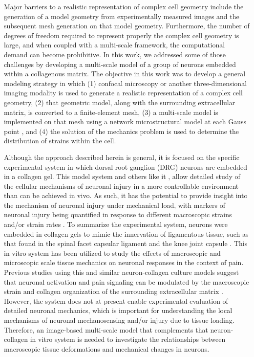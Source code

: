 \documentclass[]{interact}
\begin{document}
Major barriers to a realistic representation of complex cell geometry include the generation of a model geometry from experimentally measured images and the subsequent mesh generation on that model geometry. Furthermore, the number of degrees of freedom required to represent properly the complex cell geometry is large, and when coupled with a multi-scale framework, the computational demand can become prohibitive. In this work, we addressed some of those challenges by developing a multi-scale model of a group of neurons embedded within a collagenous matrix. The objective in this work was to develop a general modeling strategy in which (1) confocal microscopy or another three-dimensional imaging modality is used to generate a realistic representation of a complex cell geometry, (2) that geometric model, along with the surrounding extracellular matrix, is converted to a finite-element mesh, (3) a multi-scale model is implemented on that mesh using a network microstructural model at each Gauss point \citep{Chandran:2007hy,Stylianopoulos:2007dp}, and (4) the solution of the mechanics problem is used to determine the distribution of strains within the cell. 

Although the approach described herein is general, it is focused on the specific experimental system in which dorsal root ganglion (DRG) neurons are embedded in a collagen gel. This model system and others like it  \citep{Zhang:2016ga,Zhang:2017gr,Zhang:2017kq}, allow detailed study of the cellular mechanisms of neuronal injury in a more controllable environment than can be achieved in vivo. As such, it has the potential to provide insight into the mechanism of neuronal injury under mechanical load, with markers of neuronal injury being quantified in response to different macroscopic strains and/or strain rates \citep{Zhang:2016ga}. To summarize the experimental system, neurons were embedded in collagen gels to mimic the innervation of ligamentous tissue, such as that found in the spinal facet capsular ligament \citep{McLain1998RF,Kallakuri:2012ib} and the knee joint capsule \citep{Schultz1984RA,Khalsa:CKPnLlfY}. This in vitro system has been utilized to study the effects of macroscopic and microscopic scale tissue mechanics on neuronal responses in the context of pain. Previous studies using this and similar neuron-collagen culture models suggest that neuronal activation and pain signaling can be modulated by the macroscopic strain and collagen organization of the surrounding extracellular matrix \citep{Zhang:2016ga, Zhang:2017gr}. However, the system does not at present enable experimental evaluation of detailed neuronal mechanics, which is important for understanding the local mechanisms of neuronal mechanosensing and/or injury due to tissue loading. Therefore, an image-based multi-scale model that complements that neuron-collagen in vitro system is needed to investigate the relationships between macroscopic tissue deformations and mechanical changes in neurons. 
\end{document}

